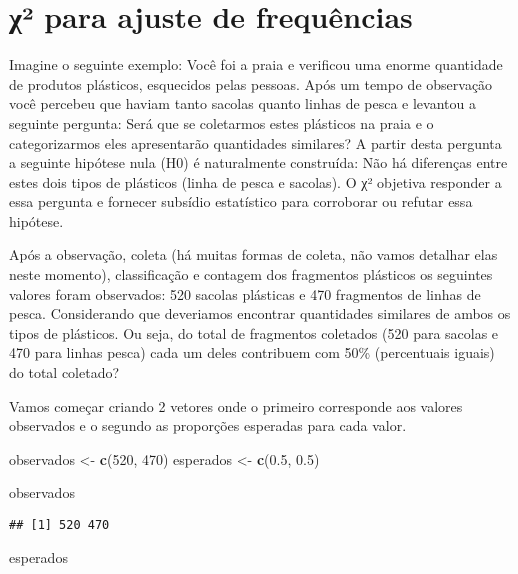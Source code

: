\documentclass[]{book}
\newenvironment{Shaded}{\begin{snugshade}}{\end{snugshade}}
\newcommand{\DecValTok}[1]{\textcolor[rgb]{0.00,0.00,0.81}{#1}}
\newcommand{\FloatTok}[1]{\textcolor[rgb]{0.00,0.00,0.81}{#1}}
\newcommand{\KeywordTok}[1]{\textcolor[rgb]{0.13,0.29,0.53}{\textbf{#1}}}
\newcommand{\NormalTok}[1]{#1}
\newcommand{\StringTok}[1]{\textcolor[rgb]{0.31,0.60,0.02}{#1}}
\begin{document}
\hypertarget{ux3c7-para-ajuste-de-frequuxeancias}{%
\section{χ² para ajuste de frequências}\label{ux3c7-para-ajuste-de-frequuxeancias}}

Imagine o seguinte exemplo: Você foi a praia e verificou uma enorme quantidade de produtos plásticos, esquecidos pelas pessoas. Após um tempo de observação você percebeu que haviam tanto sacolas quanto linhas de pesca e levantou a seguinte pergunta: Será que se coletarmos estes plásticos na praia e o categorizarmos eles apresentarão quantidades similares? A partir desta pergunta a seguinte hipótese nula (H0) é naturalmente construída: Não há diferenças entre estes dois tipos de plásticos (linha de pesca e sacolas). O χ² objetiva responder a essa pergunta e fornecer subsídio estatístico para corroborar ou refutar essa hipótese.

Após a observação, coleta (há muitas formas de coleta, não vamos detalhar elas neste momento), classificação e contagem dos fragmentos plásticos os seguintes valores foram observados: 520 sacolas plásticas e 470 fragmentos de linhas de pesca. Considerando que deveriamos encontrar quantidades similares de ambos os tipos de plásticos. Ou seja, do total de fragmentos coletados (520 para sacolas e 470 para linhas pesca) cada um deles contribuem com 50\% (percentuais iguais) do total coletado?

Vamos começar criando 2 vetores onde o primeiro corresponde aos valores observados e o segundo as proporções esperadas para cada valor.

\begin{Shaded}
\begin{Highlighting}[]
\NormalTok{observados <-}\StringTok{ }\KeywordTok{c}\NormalTok{(}\DecValTok{520}\NormalTok{, }\DecValTok{470}\NormalTok{)}
\NormalTok{esperados <-}\StringTok{ }\KeywordTok{c}\NormalTok{(}\FloatTok{0.5}\NormalTok{, }\FloatTok{0.5}\NormalTok{)}

\NormalTok{observados}
\end{Highlighting}
\end{Shaded}

\begin{verbatim}
## [1] 520 470
\end{verbatim}

\begin{Shaded}
\begin{Highlighting}[]
\NormalTok{esperados}
\end{Highlighting}
\end{Shaded}
\end{document}
